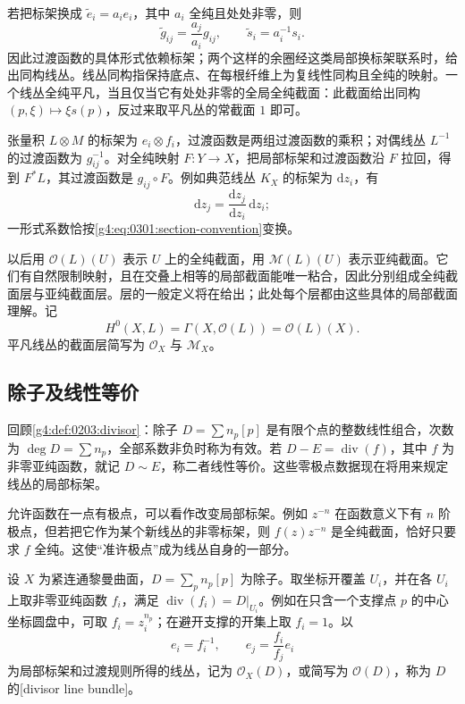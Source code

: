 \ProseParagraphBreak

若把标架换成 \(\widetilde e_i=a_i e_i\)，其中 \(a_i\) 全纯且处处非零，则
\[
	\widetilde g_{ij}=\frac{a_j}{a_i}g_{ij},
	\qquad
	\widetilde s_i=a_i^{-1}s_i.
\]
因此过渡函数的具体形式依赖标架；两个这样的余圈经这类局部换标架联系时，给出同构线丛。线丛同构指保持底点、在每根纤维上为复线性同构且全纯的映射。一个线丛全纯平凡，当且仅当它有处处非零的全局全纯截面：此截面给出同构 \((p,\xi)\mapsto \xi s(p)\)，反过来取平凡丛的常截面 \(1\) 即可。

\ProseParagraphBreak

张量积 \(L\otimes M\) 的标架为 \(e_i\otimes f_i\)，过渡函数是两组过渡函数的乘积；对偶线丛 \(L^{-1}\) 的过渡函数为 \(g_{ij}^{-1}\)。对全纯映射 \(F:Y\to X\)，把局部标架和过渡函数沿 \(F\) 拉回，得到 \(F^*L\)，其过渡函数是 \(g_{ij}\circ F\)。例如典范线丛 \(K_X\) 的标架为 \(\mathrm{d}z_i\)，有
\[
	\mathrm{d}z_j=\frac{\mathrm{d}z_j}{\mathrm{d}z_i}\,\mathrm{d}z_i;
\]
一形式系数恰按\eqref{g4:eq:0301:section-convention}变换。

\ProseParagraphBreak

以后用 \(\mathcal O(L)(U)\) 表示 \(U\) 上的全纯截面，用 \(\mathcal M(L)(U)\) 表示亚纯截面。它们有自然限制映射，且在交叠上相等的局部截面能唯一粘合，因此分别组成全纯截面层与亚纯截面层。层的一般定义将在给出；此处每个层都由这些具体的局部截面理解。记
\[
	H^0(X,L)=\Gamma(X,\mathcal O(L))=\mathcal O(L)(X).
\]
平凡线丛的截面层简写为 \(\mathcal O_X\) 与 \(\mathcal M_X\)。

\subsection{除子及线性等价}
\label{g4:subsec:0301:02}

回顾\cref{g4:def:0203:divisor}：除子 \(D=\sum n_p[p]\) 是有限个点的整数线性组合，次数为 \(\deg D=\sum n_p\)，全部系数非负时称为有效。若 \(D-E=\operatorname{div}(f)\)，其中 \(f\) 为非零亚纯函数，就记 \(D\sim E\)，称二者线性等价。这些零极点数据现在将用来规定线丛的局部标架。

\ProseParagraphBreak

允许函数在一点有极点，可以看作改变局部标架。例如 \(z^{-n}\) 在函数意义下有 \(n\) 阶极点，但若把它作为某个新线丛的非零标架，则 \(f(z)z^{-n}\) 是全纯截面，恰好只要求 \(f\) 全纯。这使“准许极点”成为线丛自身的一部分。

\begin{definition}\label{g4:def:0301:divisor-bundle}
	设 \(X\) 为紧连通黎曼曲面，\(D=\sum_p n_p[p]\) 为除子。取坐标开覆盖 \(U_i\)，并在各 \(U_i\) 上取非零亚纯函数 \(f_i\)，满足 \(\operatorname{div}(f_i)=D|_{U_i}\)。例如在只含一个支撑点 \(p\) 的中心坐标圆盘中，可取 \(f_i=z_i^{n_p}\)；在避开支撑的开集上取 \(f_i=1\)。以
	\[
		e_i=f_i^{-1},\qquad e_j=\frac{f_i}{f_j}e_i
	\]
	为局部标架和过渡规则所得的线丛，记为 \(\mathcal O_X(D)\)，或简写为 \(\mathcal O(D)\)，称为 \(D\) 的[divisor line bundle]。
\end{definition}

